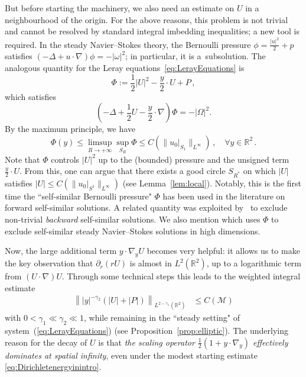 \documentclass[12pt,reqno]{amsart}
\theoremstyle{plain}
\theoremstyle{definition}
\newcommand{\R}{\mathbb{R}}
\newcommand{\M}{\mathcal{M}}
\renewcommand{\:}{\colon}
\numberwithin{equation}{section}
\numberwithin{figure}{section}
\begin{document}
 But before starting the machinery, we also need an estimate on $U$ in a neighbourhood of the origin. For the above reasons, this problem is not trivial  and cannot be resolved by standard integral imbedding inequalities; a new tool is required.  In the steady Navier--Stokes theory, the Bernoulli pressure $\phi = \frac{|u|^2}{2} + p$ satisfies $(- \Delta + u \cdot \nabla)\phi = - |\omega|^2$; in particular, it is a~subsolution. The analogous quantity for the Leray equations~\eqref{eq:LerayEquations} is
\begin{equation}
\label{eq:Bernoullipressureforselfsim}
    \Phi := \frac{1}{2} |U|^2 - \frac{y}{2} \cdot  U + P \, ,
\end{equation}
which satisfies
\begin{equation}
    (- \Delta + \frac{1}{2}U - \frac{y}{2} \cdot \nabla) \Phi = - |\Omega|^2.
\end{equation}
By the maximum principle, we have
\begin{equation}
    \Phi(y) \leq \limsup_{R \to +\infty}  \sup_{S_R} \Phi \leq C(\| u_0|_{S_1} \|_{L^\infty}) \, , \quad \forall y \in \R^2 \, .
\end{equation}
Note that $\Phi$ controls $|U|^2$ up to the (bounded) pressure and the unsigned term $\frac{y}{2}\cdot  U$. From this, one can argue that there exists a good circle $S_{R^*}$ on which $|U|$ satisfies $|U| \leq C(\| u_0|_{S^1} \|_{L^\infty})$ (see Lemma~\ref{lem:local}). Notably, this is the first time the ``self-similar Bernoulli pressure" $\Phi$ has been used in the literature on forward self-similar solutions. A related quantity was exploited by~\cite{NecasRuzickaSverak,TsaiBackwardSelfSim} to exclude non-trivial \emph{backward} self-similar solutions. We also mention \cite{JaySelfsimHighdim} which uses $\Phi$ to exclude self-similar steady Navier--Stokes solutions in high dimensions.  


Now,  the large additional term $y \cdot \nabla_y U$ becomes very helpful:
it allows us to make the key observation that $\partial_r(rU)$ is almost in $L^2(\R^2)$, up to a logarithmic term from 
$(U\cdot\nabla)U$. Through some technical steps this leads to the weighted integral estimate
	\begin{align} \label{eq:key-w2-UP}
		\left\||y|^{-\gamma_2} (|U|+|P|)\right\|_{L^{2-\gamma_1}(\R^2)} 
		&\le C(\M)
	\end{align} 
with $0< \gamma_1 \ll \gamma_2 \ll 1$, 
 while remaining in the ``steady setting" of system~(\ref{eq:LerayEquations}) 
(see Proposition~\ref{prop:elliptic}). The underlying reason for the decay of $U$ is that \emph{the scaling operator $\frac{1}{2}(1+y\cdot \nabla_y)$ effectively dominates at spatial infinity}, even under the modest starting estimate \eqref{eq:Dirichletenergyinintro}.
\end{document}
